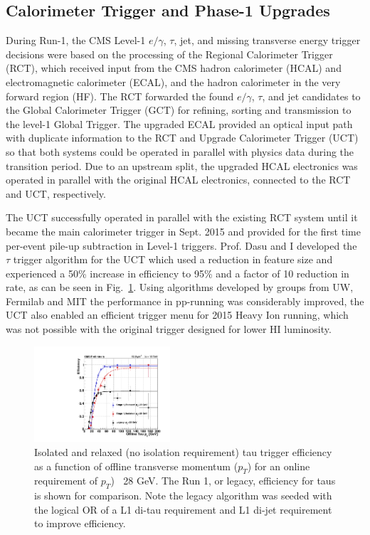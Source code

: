 \documentclass[preprint,12pt]{elsarticle}
\begin{document}
\subsection{Calorimeter Trigger and Phase-1 Upgrades}
During Run-1, the CMS Level-1 $e/\gamma$, $\tau$, jet, and missing transverse energy trigger decisions were based
on the processing of the Regional Calorimeter Trigger (RCT), which received input from the
CMS hadron calorimeter (HCAL) and electromagnetic calorimeter (ECAL), and the hadron calorimeter in
the very forward region (HF). The RCT forwarded the found $e/\gamma$, $\tau$, and jet candidates 
to the Global Calorimeter Trigger (GCT) for refining, sorting and transmission to the level-1 Global Trigger.
The upgraded ECAL provided an optical input path with duplicate information to the RCT and
Upgrade Calorimeter Trigger (UCT) so that both systems could be
operated in parallel with physics data during the transition period. 
Due to an upstream split, the upgraded HCAL electronics was operated in parallel with the original 
HCAL electronics, connected to the RCT and UCT, respectively.

The UCT successfully operated in parallel with the existing RCT system until it became the 
main calorimeter trigger in Sept. 2015 and provided for the first
time per-event pile-up subtraction in Level-1 triggers. 
Prof. Dasu and I developed the $\tau$ trigger algorithm for the UCT which used a reduction in feature size and experienced a 50\% increase in efficiency
to 95\% and a factor of 10 reduction in rate, as can be seen in Fig.~\ref{fig:tau_stage1}.
Using algorithms developed by groups from UW, Fermilab and MIT 
the performance in pp-running was considerably improved, the UCT also enabled an efficient trigger menu for 2015 Heavy Ion
running, which was not possible with the original trigger designed for lower HI luminosity.

\begin{figure}[htbp]
    \centering
    \includegraphics[trim=260 60 50 50,clip,width=0.45\textwidth]{TDR_RlxIsoLegacy_28GeV.png}
    \centering \caption{Isolated and relaxed (no isolation requirement) tau trigger efficiency as a 
       function of offline transverse momentum ($p_{T}$) for an online requirement of $p_{T}$) $\>$ 28 GeV. The
       Run 1, or legacy, efficiency for taus is shown for comparison. Note the legacy algorithm
       was seeded with the logical OR of a L1 di-tau requirement and L1 di-jet requirement to improve
       efficiency.}
     \label{fig:tau_stage1}
\end{figure}
\end{document}
